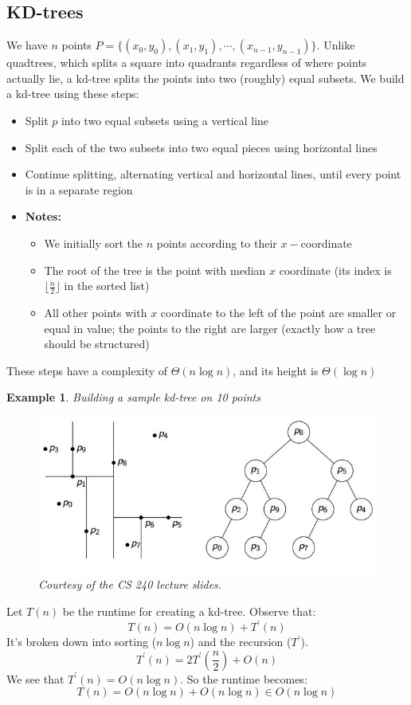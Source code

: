 \documentclass{report}
\newtheorem{ex}{Example}[section]
\begin{document}
\subsection{KD-trees}
We have $n$ points $P = \{(x_0,y_0), (x_1,y_1), \cdots, (x_{n-1},y_{n-1})\}$. Unlike quadtrees, which splits a square into quadrants regardless of where points actually lie, a kd-tree splits the points into two (roughly) equal subsets. We build a kd-tree using these steps:
\begin{itemize}
\item Split $p$ into two equal subsets using a vertical line
\item Split each of the two subsets into two equal pieces using horizontal lines
\item Continue splitting, alternating vertical and horizontal lines, until every point is in a separate region
\item \textbf{Notes:}
\begin{itemize}
\item We initially sort the $n$ points according to their $x-$coordinate
\item The root of the tree is the point with median $x$ coordinate (its index is $\lfloor \frac{n}{2}\rfloor$ in the sorted list)
\item All other points with $x$ coordinate to the left of the point are smaller or equal in value; the points to the right are larger (exactly how a tree should be structured)
\end{itemize} 
\end{itemize}
These steps have a complexity of $\Theta(n \log n)$, and its height is $\Theta(\log n)$
\begin{ex}
Building a sample kd-tree on 10 points
\end{ex}
\begin{figure}[ht]
\begin{center}
\includegraphics[scale=0.6]{kdtree.jpg}
\end{center}
\caption{\textit{Courtesy of the CS 240 lecture slides.}}
\end{figure}
Let $T(n)$ be the runtime for creating a kd-tree. Observe that:
$$T(n) = O(n \log n) + T^\prime(n)$$
It's broken down into sorting ($n \log n$) and the recursion ($T^\prime$).
$$T^\prime(n) = 2T^\prime\left(\frac{n}{2}\right) + O(n)$$
We see that $T^\prime(n) = O(n \log n)$. So the runtime becomes:
$$T(n) = O(n \log n) + O(n \log n) \in O(n \log n)$$
\end{document}
